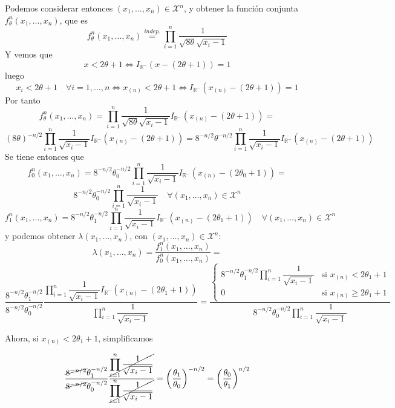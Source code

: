 \documentclass[12pt]{article}
\newcommand{\R}{\mathbb{R}}
\newcommand{\X}{\mathcal{X}}
\newcommand{\Rmenos}{\R^{-}}
\begin{document}
\begin{ejercicio}
        Podemos considerar entonces $(x_1, \ldots, x_n) \in \X^n$, y obtener la función conjunta $f_\theta^n(x_1, \ldots, x_n)$, que es 
        $$f_\theta^n(x_1, \ldots, x_n) \stackrel{indep.}{=} \prod_{i=1}^n \dfrac{1}{\sqrt{8\theta}\sqrt{x_i-1}}$$ 
        Y vemos que $$x<2\theta+1 \iff I_{\Rmenos}(x - (2\theta + 1)) = 1$$
        luego $$x_i < 2 \theta + 1 \quad \forall i = 1, \ldots, n \iff x_{(n)} < 2 \theta + 1 \iff I_{\Rmenos}(x_{(n)} - (2 \theta + 1)) = 1$$
        Por tanto $$f_\theta^n(x_1, \ldots, x_n) = \prod_{i=1}^n \dfrac{1}{\sqrt{8\theta}\sqrt{x_i-1}} I_{\Rmenos}(x_{(n)} - (2\theta + 1)) = $$
        $$(8\theta)^{-n/2} \prod_{i=1}^n \dfrac{1}{\sqrt{x_i-1}} I_{\Rmenos}(x_{(n)} - (2\theta + 1)) =
        8^{-n/2}\theta^{-n/2} \prod_{i=1}^n \dfrac{1}{\sqrt{x_i-1}} I_{\Rmenos}(x_{(n)} - (2\theta + 1))$$
        Se tiene entonces que
        $$f_0^n(x_1, \ldots, x_n) = 8^{-n/2}\theta_0^{-n/2} \prod_{i=1}^n \dfrac{1}{\sqrt{x_i-1}} I_{\Rmenos}(x_{(n)} - (2\theta_0 + 1)) = $$
        $$8^{-n/2}\theta_0^{-n/2} \prod_{i=1}^n \dfrac{1}{\sqrt{x_i-1}} \quad \forall (x_1, \ldots, x_n) \in \X^n$$
        $$f_1^n(x_1, \ldots, x_n) = 8^{-n/2}\theta_1^{-n/2} \prod_{i=1}^n \dfrac{1}{\sqrt{x_i-1}} I_{\Rmenos}(x_{(n)} - (2\theta_1 + 1)) \quad \forall (x_1, \ldots, x_n) \in \X^n$$
        y podemos obtener $\lambda(x_1, \ldots, x_n)$, con $(x_1, \ldots, x_n) \in \X^n$: 
        $$\lambda(x_1, \ldots, x_n) = \dfrac{f_1^n(x_1, \ldots, x_n)}{f_0^n(x_1, \ldots, x_n)} = $$$$
        \dfrac{8^{-n/2}\theta_1^{-n/2}}{8^{-n/2}\theta_0^{-n/2}} \dfrac{\displaystyle\prod_{i=1}^n \dfrac{1}{\sqrt{x_i-1}} I_{\Rmenos}(x_{(n)} - (2\theta_1 + 1))}
        {\displaystyle\prod_{i=1}^n \dfrac{1}{\sqrt{x_i-1}}} = 
        \dfrac{\begin{cases} 8^{-n/2}\theta_1^{-n/2} \displaystyle\prod_{i=1}^n \dfrac{1}{\sqrt{x_i-1}} &\text{si } x_{(n)} < 2\theta_1 + 1 \\ 0 &\text{si } x_{(n)} \geq 2\theta_1 + 1 \end{cases}}
        {8^{-n/2}\theta_0^{-n/2} \displaystyle\prod_{i=1}^n \dfrac{1}{\sqrt{x_i-1}}}$$

        Ahora, si $x_{(n)} < 2\theta_1 + 1$, simplificamos

        $$\dfrac{\cancel{8^{-n/2}}\theta_1^{-n/2}}{\cancel{8^{-n/2}}\theta_0^{-n/2}} \dfrac{\cancel{\displaystyle\prod_{i=1}^n \dfrac{1}{\sqrt{x_i-1}}}}
        {\cancel{\displaystyle\prod_{i=1}^n \dfrac{1}{\sqrt{x_i-1}}}} = \left( \dfrac{\theta_1}{\theta_0} \right)^{-n/2} = \left( \dfrac{\theta_0}{\theta_1} \right)^{n/2}$$


\end{ejercicio}
\end{document}
